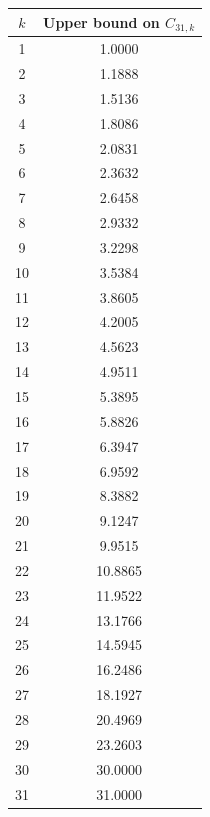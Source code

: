 \documentclass[11pt]{article}
\begin{document}
\begin{table}
\begin{minipage}[t]{.5\linewidth}
        \begin{tabular}{c|c}
        \hline
        $k$ & Upper bound on $C_{31,k}$ \\
        \hline
        1  & 1.0000 \\
        2  & 1.1888 \\
        3  & 1.5136 \\
        4  & 1.8086 \\
        5  & 2.0831 \\
        6  & 2.3632 \\
        7  & 2.6458 \\
        8  & 2.9332 \\
        9  & 3.2298 \\
        10 & 3.5384 \\
        11 & 3.8605 \\
        12 & 4.2005 \\
        13 & 4.5623 \\
        14 & 4.9511 \\
        15 & 5.3895 \\
        16 & 5.8826 \\
        17 & 6.3947 \\
        18 & 6.9592 \\
        19 & 8.3882 \\
        20 & 9.1247 \\
        21 & 9.9515 \\
        22 & 10.8865 \\
        23 & 11.9522 \\
        24 & 13.1766 \\
        25 & 14.5945 \\
        26 & 16.2486 \\
        27 & 18.1927 \\
        28 & 20.4969 \\
        29 & 23.2603 \\
        30 & 30.0000 \\
        31 & 31.0000 \\
        \hline
        \end{tabular}
    \end{minipage}



    

    
\end{table}
\end{document}
